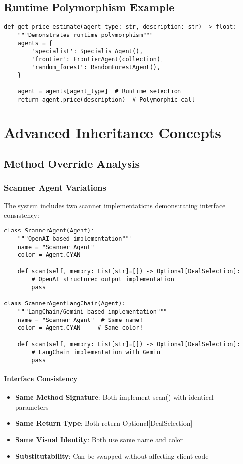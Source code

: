 \subsection{Runtime Polymorphism Example}

\begin{lstlisting}[caption=Dynamic Agent Selection]
def get_price_estimate(agent_type: str, description: str) -> float:
    """Demonstrates runtime polymorphism"""
    agents = {
        'specialist': SpecialistAgent(),
        'frontier': FrontierAgent(collection),
        'random_forest': RandomForestAgent(),
    }
    
    agent = agents[agent_type]  # Runtime selection
    return agent.price(description)  # Polymorphic call
\end{lstlisting}

\section{Advanced Inheritance Concepts}

\subsection{Method Override Analysis}

\subsubsection{Scanner Agent Variations}

The system includes two scanner implementations demonstrating interface consistency:

\begin{lstlisting}[caption=Scanner Agent Polymorphism]
class ScannerAgent(Agent):
    """OpenAI-based implementation"""
    name = "Scanner Agent"
    color = Agent.CYAN
    
    def scan(self, memory: List[str]=[]) -> Optional[DealSelection]:
        # OpenAI structured output implementation
        pass

class ScannerAgentLangChain(Agent):
    """LangChain/Gemini-based implementation"""
    name = "Scanner Agent"  # Same name!
    color = Agent.CYAN     # Same color!
    
    def scan(self, memory: List[str]=[]) -> Optional[DealSelection]:
        # LangChain implementation with Gemini
        pass
\end{lstlisting}

\paragraph{Interface Consistency}
\begin{itemize}
\item \textbf{Same Method Signature}: Both implement scan() with identical parameters
\item \textbf{Same Return Type}: Both return Optional[DealSelection]
\item \textbf{Same Visual Identity}: Both use same name and color
\item \textbf{Substitutability}: Can be swapped without affecting client code
\end{itemize}

